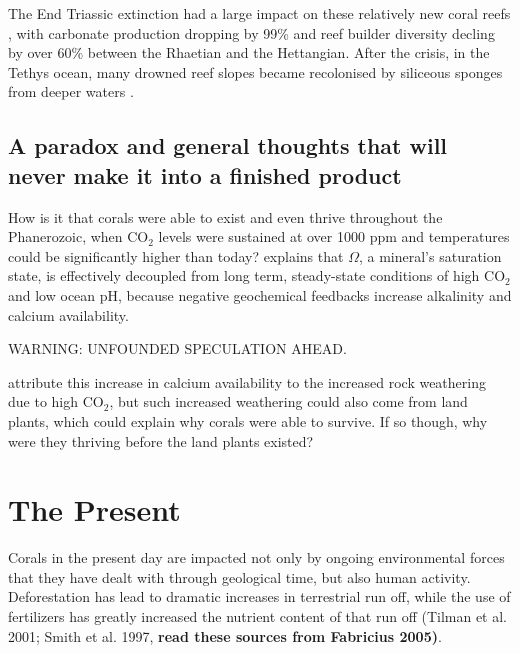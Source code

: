 \documentclass[11pt,a4paper]{article}
\begin{document}
The End Triassic extinction had a large impact on these relatively new coral reefs \citep{Kiessling2009}, with carbonate production dropping by 99\% and reef builder diversity decling by over 60\% between the Rhaetian and the Hettangian.%
After the crisis, in the Tethys ocean, many drowned reef slopes became recolonised by siliceous sponges from deeper waters \citep{Delecat2011}.
 
 

\citep{Kiessling2009}
\cite{Kiessling2011}
\cite{Delecat2011}


\subsection{A paradox and general thoughts that will never make it into a finished product}

How is it that corals were able to exist and even thrive throughout the Phanerozoic, when CO$_{2}$ levels were sustained at over 1000 ppm and temperatures could be significantly higher than today?
 \cite{Pandolfi2011} explains that $\Omega$, a mineral's saturation state, is effectively decoupled from long term, steady-state conditions of high CO$_{2}$ and low ocean pH, because negative geochemical feedbacks increase alkalinity and calcium availability.

WARNING: UNFOUNDED SPECULATION AHEAD.

 \cite{Pandolfi2011} attribute this increase in calcium availability to the increased rock weathering due to high CO$_{2}$, but such increased weathering could also come from land plants, which could explain why corals were able to survive. If so though, why were they thriving before the land plants existed?



\section{The Present}

Corals in the present day are impacted not only by ongoing environmental forces that they have dealt with through geological time, but also human activity.
 Deforestation has lead to dramatic increases in terrestrial run off, while the use of fertilizers has greatly increased the nutrient content of that run off (Tilman et al. 2001; Smith et al. 1997, \textbf{read these sources from Fabricius 2005)}. 
\end{document}
